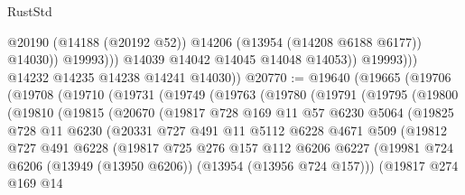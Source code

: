 \begin{lexlean}{RustStd}
\begin{coremodule}
                            @20190
                            (@14188 (@20192 @52))
                            @14206
                            (@13954 (@14208 @6188 @6177))
                            @14030))
                        @19993)))
                  @14039
                  @14042
                  @14045
                  @14048
                  @14053))
              @19993)))
        @14232
        @14235
        @14238
        @14241
        @14030))
@20770 := @19640
    (@19665
      (@19706
        (@19708
          (@19710
            (@19731
              (@19749
                (@19763
                  (@19780
                    (@19791
                      (@19795
                        (@19800
                          (@19810
                            (@19815
                              (@20670
                                (@19817
                                  @728
                                  @169
                                  @11
                                  @57
                                  @6230
                                  @5064
                                  (@19825
                                    @728
                                    @11
                                    @6230
                                    (@20331
                                      @727
                                      @491
                                      @11
                                      @5112
                                      @6228
                                      @4671
                                      @509
                                      (@19812
                                        @727
                                        @491
                                        @6228
                                        (@19817
                                          @725
                                          @276
                                          @157
                                          @112
                                          @6206
                                          @6227
                                          (@19981
                                            @724
                                            @6206
                                            (@13949 (@13950 @6206))
                                            (@13954 (@13956 @724 @157)))
                                          (@19817
                                            @274
                                            @169
                                            @14

\end{coremodule}
\end{lexlean}

